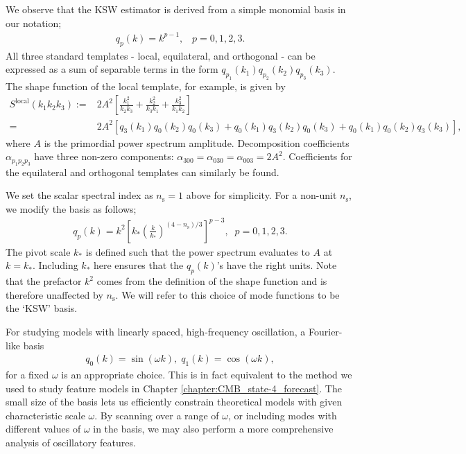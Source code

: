 We observe that the KSW estimator \cite{Komatsu2005} is derived from a simple monomial basis in our notation;
\begin{align}
	q_p(k) = k^{p-1}, \;\;\; p = 0, 1, 2, 3.
\end{align}
All three standard templates - local, equilateral, and orthogonal - can be expressed as a sum of separable terms in the form $q_{p_1}(k_1) q_{p_2}(k_2) q_{p_3}(k_3)$. The shape function of the local template, for example, is given by
\begin{align}
	S^\textrm{local}(k_1 k_2 k_3) :=& 2A^2 \left[ \frac{k_1^2}{k_2 k_3} + \frac{k_2^2}{k_3 k_1} + \frac{k_3^2}{k_1 k_2}  \right] \\
	=& 2A^2 \left[q_3(k_1)q_0(k_2)q_0(k_3) + q_0(k_1)q_3(k_2)q_0(k_3) + q_0(k_1)q_0(k_2)q_3(k_3) \right],
\end{align}
where $A$ is the primordial power spectrum amplitude. Decomposition coefficients $\alpha_{p_1 p_2 p_3}$ have three non-zero components: $\alpha_{300} = \alpha_{030} = \alpha_{003} = 2A^2$. Coefficients for the equilateral and orthogonal templates can similarly be found.

We set the scalar spectral index as $n_\text{s} = 1$ above for simplicity. For a non-unit $n_\text{s}$, we modify the basis as follows;
\begin{align}
	q_p(k) = k^2 \left[ k_* \left( \frac{k}{k_*} \right)^{(4-n_\text{s})/3} \right]^{p-3}, \;\; p=0,1,2,3. \label{eqn:KSW_basis}
\end{align}
The pivot scale $k_*$ is defined such that the power spectrum evaluates to $A$ at $k=k_*$. Including $k_*$ here ensures that the $q_p(k)$'s have the right units. Note that the prefactor $k^2$ comes from the definition of the shape function and is therefore unaffected by $n_\text{s}$. We will refer to this choice of mode functions to be the `KSW' basis.

For studying models with linearly spaced, high-frequency oscillation, a Fourier-like basis
\begin{align}
	q_0(k) = \sin (\omega k), \; q_1(k) = \cos (\omega k), \label{eqn:Fourier_basis}
\end{align}
for a fixed $\omega$ is an appropriate choice. This is in fact equivalent to the method we used to study feature models in Chapter \ref{chapter:CMB_state-4_forecast}. The small size of the basis lets us efficiently constrain theoretical models with given characteristic scale $\omega$. By scanning over a range of $\omega$, or including modes with different values of $\omega$ in the basis, we may also perform a more comprehensive analysis of oscillatory features.

